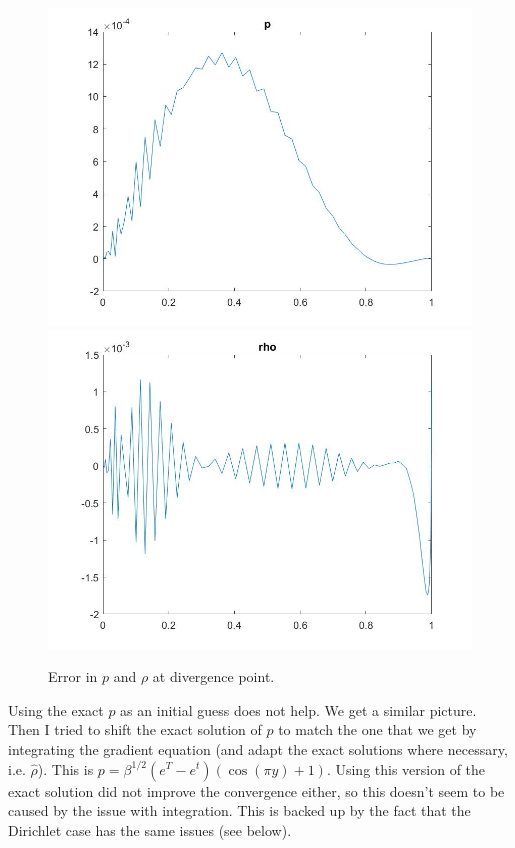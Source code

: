 \documentclass[11pt, a4paper]{article}
\theoremstyle{definition}
\begin{document}
\begin{figure}[h]
	\includegraphics[scale=0.3]{Neump.jpg}
	\includegraphics[scale=0.3]{Neumrho.jpg}
	\caption{Error in $p$ and $\rho$ at divergence point.}
\end{figure}
Using the exact $p$ as an initial guess does not help. We get a similar picture. \\
Then I tried to shift the exact solution of $p$ to match the one that we get by integrating the gradient equation (and adapt the exact solutions where necessary, i.e. $\hat \rho$). 
This is $p = \beta^{1/2} (e^T - e^t)(\cos(\pi y) +1)$.  Using this version of the exact solution did not improve the convergence either, so this doesn't seem to be caused by the issue with integration. This is backed up by the fact that the Dirichlet case has the same issues (see below).
\end{document}

